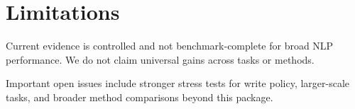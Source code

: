 \section{Limitations}
Current evidence is controlled and not benchmark-complete for broad NLP performance. We do not claim universal gains across tasks or methods.

Important open issues include stronger stress tests for write policy, larger-scale tasks, and broader method comparisons beyond this package.
